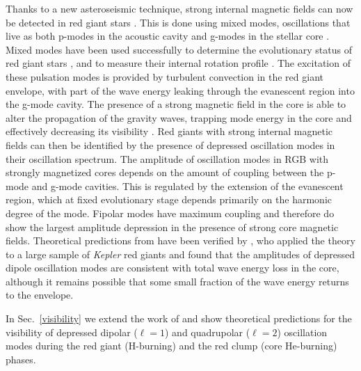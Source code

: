 Thanks to a new asteroseismic technique, strong internal magnetic fields can now be detected in red giant stars \citep{Fuller_2015}. This is done using mixed modes, oscillations that live as both p-modes in the acoustic cavity and g-modes in the stellar core \cite{Dupret_2009}. Mixed modes have been used successfully  to determine the evolutionary status of red giant stars \citep{Bedding_2011}, and to measure their internal rotation profile \citep{Beck_2011}.  
The excitation of these pulsation modes is provided by turbulent convection in the red giant envelope, with part of the wave energy leaking through the evanescent region into the g-mode cavity. The presence of a strong magnetic field in the core is able to alter the propagation of the gravity waves, trapping  mode energy in the core and effectively decreasing its visibility \citep[magnetic greenhouse effect,][]{Fuller_2015}. Red giants with strong internal magnetic fields can then be identified by the presence of depressed oscillation modes in their oscillation spectrum. The amplitude of oscillation modes in RGB with strongly magnetized cores depends on the amount of coupling between the p-mode and g-mode cavities. This is regulated by the extension of the evanescent region, which at fixed evolutionary stage depends primarily on the harmonic degree of the mode. Fipolar modes have maximum coupling and therefore do show the largest amplitude depression in the presence of strong core magnetic fields. Theoretical predictions from \citet{Fuller_2015} have been verified by \cite{Stello_2016}, who applied the theory to a large sample of {\it Kepler} red giants and found that the amplitudes of depressed dipole oscillation modes are consistent with total wave energy loss in the core, although it remains possible that some small fraction of the wave energy returns to the envelope.

In Sec.~\ref{visibility} we extend the work of \citet{Fuller_2015} and show theoretical predictions for the visibility of depressed dipolar ($\ell=1$) and quadrupolar ($\ell=2$) oscillation modes during the red giant  (H-burning) and  the red clump (core He-burning) phases. 




  